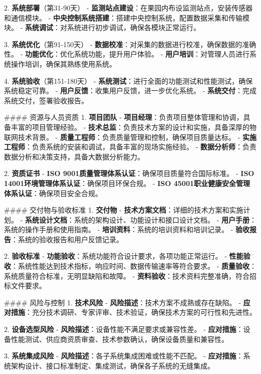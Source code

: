 \documentclass[12pt,a4paper]{article}
\begin{document}
\begin{itemize}
\begin{itemize}
\begin{itemize}
\begin{itemize}
\begin{itemize}
\begin{itemize}
\begin{itemize}
\begin{itemize}
\begin{itemize}
\begin{itemize}
\begin{itemize}
2. \textbf{系统部署}（第31-90天）
- \textbf{监测站点建设}：在果园内布设监测站点，安装传感器和通信模块。
- \textbf{中央控制系统搭建}：搭建中央控制系统，配置数据采集和传输模块。
- \textbf{系统调试}：对系统进行初步调试，确保各模块正常运行。

3. \textbf{系统优化}（第91-150天）
- \textbf{数据校准}：对采集的数据进行校准，确保数据的准确性。
- \textbf{功能优化}：优化系统功能，提升用户体验。
- \textbf{用户培训}：对管理人员进行系统操作培训，确保其熟练使用系统。

4. \textbf{系统验收}（第151-180天）
- \textbf{系统测试}：进行全面的功能测试和性能测试，确保系统稳定可靠。
- \textbf{用户反馈}：收集用户反馈，进一步优化系统。
- \textbf{系统交付}：完成系统交付，签署验收报告。

#### 资源与人员资质
1. \textbf{项目团队}
- \textbf{项目经理}：负责项目整体管理和协调，具备丰富的项目管理经验。
- \textbf{技术总监}：负责技术方案的设计和实施，具备深厚的物联网技术背景。
- \textbf{质量工程师}：负责质量管理和控制，确保项目质量达标。
- \textbf{实施工程师}：负责系统的安装和调试，具备丰富的现场实施经验。
- \textbf{数据分析师}：负责数据分析和决策支持，具备大数据分析能力。

2. \textbf{资质证书}
- \textbf{ISO 9001质量管理体系认证}：确保项目质量符合国际标准。
- \textbf{ISO 14001环境管理体系认证}：确保项目环保合规。
- \textbf{ISO 45001职业健康安全管理体系认证}：确保项目安全合规。

#### 交付物与验收标准
1. \textbf{交付物}
- \textbf{技术方案文档}：详细的技术方案和实施计划。
- \textbf{系统设计文档}：系统的架构设计、功能设计和接口设计文档。
- \textbf{用户手册}：系统的操作手册和使用指南。
- \textbf{培训资料}：系统的培训资料和培训记录。
- \textbf{验收报告}：系统的验收报告和用户反馈记录。

2. \textbf{验收标准}
- \textbf{功能验收}：系统功能符合设计要求，各项功能正常运行。
- \textbf{性能验收}：系统性能达到技术指标，响应时间、数据传输速率等符合要求。
- \textbf{质量验收}：系统质量符合标准，无明显缺陷和故障。
- \textbf{资料验收}：技术资料完整准确，符合招标文件要求。

#### 风险与控制
1. \textbf{技术风险}
- \textbf{风险描述}：技术方案不成熟或存在缺陷。
- \textbf{应对措施}：充分技术调研、专家评审、技术验证，确保技术方案的可行性和先进性。

2. \textbf{设备选型风险}
- \textbf{风险描述}：设备性能不满足要求或兼容性差。
- \textbf{应对措施}：设备性能测试、供应商资质审查、技术参数确认，确保设备质量和兼容性。

3. \textbf{系统集成风险}
- \textbf{风险描述}：各子系统集成困难或性能不匹配。
- \textbf{应对措施}：系统架构设计、接口标准制定、集成测试，确保各子系统的无缝集成。


\end{itemize}
\end{itemize}
\end{itemize}
\end{itemize}
\end{itemize}
\end{itemize}
\end{itemize}
\end{itemize}
\end{itemize}
\end{itemize}
\end{itemize}
\end{document}
